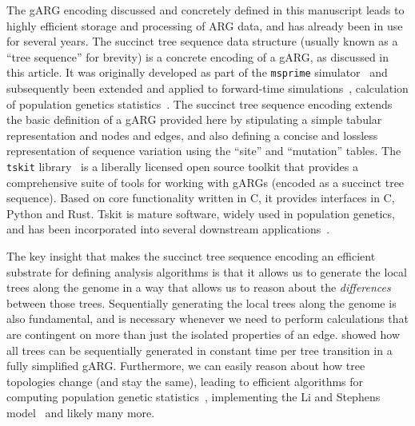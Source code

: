 \documentclass{article}
\begin{document}
The gARG encoding discussed and concretely defined in this manuscript
leads to highly efficient storage and processing of ARG data,
and has already been in use for several years.
The succinct tree sequence data structure (usually known as a ``tree sequence''
for brevity)
is a concrete encoding of a gARG, as discussed in this article.
It was originally developed as part of the \texttt{msprime}
simulator~\citep{kelleher2016efficient} and subsequently been
extended and applied to forward-time
simulations~\citep{kelleher2018efficient,haller2018tree},
calculation of population genetics statistics~\citep{ralph2020efficiently}.
The succinct tree sequence encoding extends the basic definition
of a gARG provided here by stipulating a
simple tabular representation and nodes and edges,
and also defining a concise and lossless representation of
sequence variation using the ``site'' and  ``mutation'' tables.
The \texttt{tskit} library~\citep{tskit2023tskit} is a liberally
licensed open source toolkit that provides a comprehensive suite
of tools for working with gARGs (encoded as a succinct tree sequence).
Based on core functionality written
in C, it provides interfaces in C, Python and Rust.
Tskit is mature software, widely used in population genetics, and
has been incorporated into several downstream
applications~\citep[e.g.,][]{haller2019slim,speidel2019method,
adrion2020community,
terasaki2021geonomics,
baumdicker2021efficient,
fan2022genealogical,korfmann2022weak,
mahmoudi2022bayesian,petr2022slendr,rasmussen2022espalier,
zhang2023biobank,nowbandegani2023extremely}.

The key insight that makes the succinct tree sequence encoding
an efficient substrate for defining analysis algorithms is that
it allows us to generate the local trees along the genome
in a way that allows us to reason about the \emph{differences}
between those trees.
Sequentially generating the local trees along the genome
is also fundamental, and is necessary whenever we need to
perform calculations that are contingent on more than just the
isolated properties of an edge. \cite{kelleher2016efficient}
showed how all trees can be sequentially generated in
constant time per tree transition in a fully simplified gARG.
Furthermore, we can easily reason about how tree topologies
change (and stay the same), leading to efficient algorithms
for computing population genetic
statistics~\citep{kelleher2016efficient,ralph2020efficiently},
implementing the Li and Stephens
model~\citep{kelleher2019inferring,wohns2022unified}
and likely many more.
\end{document}

